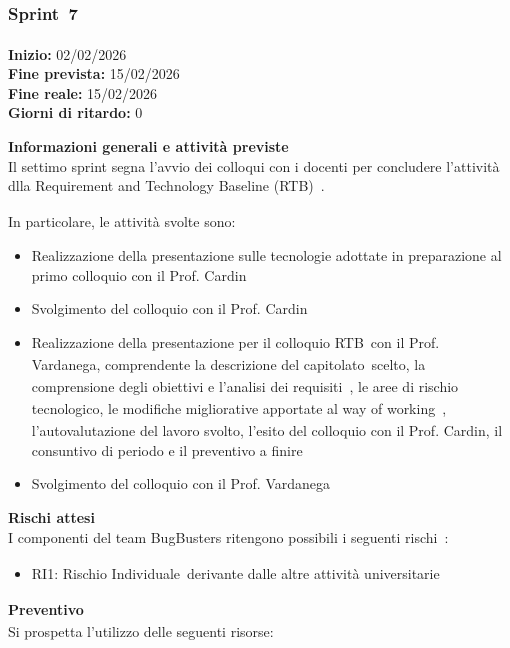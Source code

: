 \documentclass[a4paper,12pt]{article}
\newcommand{\pediceG}{\texorpdfstring{\textsubscript{\scalebox{0.6}{\textbf{G}}}~}{G}}
\begin{document}
\newpage

\subsubsection{Sprint\pediceG 7}

\textbf{Inizio:} 02/02/2026 \\
\textbf{Fine prevista:} 15/02/2026 \\
\textbf{Fine reale:} 15/02/2026 \\
\textbf{Giorni di ritardo:} 0

\noindent\textbf{Informazioni generali e attività previste}\\
Il settimo sprint segna l'avvio dei colloqui con i docenti per concludere l'attività dlla Requirement and Technology Baseline (RTB)\pediceG.

In particolare, le attività svolte sono:
\begin{itemize}
\item Realizzazione della presentazione sulle tecnologie adottate in preparazione al primo colloquio con il Prof. Cardin
\item Svolgimento del colloquio con il Prof. Cardin
\item Realizzazione della presentazione per il colloquio RTB\pediceG con il Prof. Vardanega, comprendente la descrizione del capitolato\pediceG scelto, la comprensione degli obiettivi e l'analisi dei requisiti\pediceG, le aree di rischio tecnologico, le modifiche migliorative apportate al way of working\pediceG, l'autovalutazione del lavoro svolto, l'esito del colloquio con il Prof. Cardin, il consuntivo di periodo e il preventivo a finire
\item Svolgimento del colloquio con il Prof. Vardanega
\end{itemize}

\noindent\textbf{Rischi attesi}\\
I componenti del team BugBusters ritengono possibili i seguenti rischi\pediceG:
\begin{itemize}
    \item RI1: Rischio Individuale\pediceG derivante dalle altre attività universitarie
\end{itemize}

\noindent\textbf{Preventivo\pediceG}\\
Si prospetta l'utilizzo delle seguenti risorse:
\end{document}
